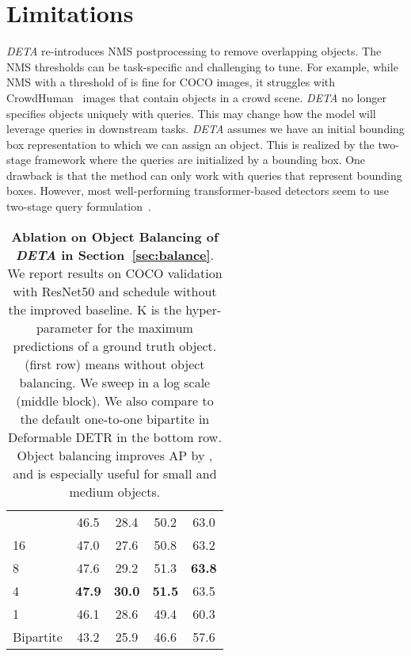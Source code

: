 \documentclass[10pt,twocolumn,letterpaper]{article}
\newcommand{\refsec}[1]{Section~\ref{sec:#1}}
\newcommand{\lbltbl}[1]{\label{tbl:#1}}
\def\name{{\textit{DETA}}\xspace}
\begin{document}
\section{Limitations}
\name re-introduces NMS postprocessing to remove overlapping objects.
The NMS thresholds can be task-specific and challenging to tune.
For example, while NMS with a threshold of  is fine for COCO images, it struggles with CrowdHuman~\cite{shao2018crowdhuman} images that contain objects in a crowd scene.
\name no longer specifies objects uniquely with queries.
This may change how the model will leverage queries in downstream tasks.
\name assumes we have an initial bounding box representation to which we can assign an object.
This is realized by the two-stage framework where the queries are initialized by a bounding box.
One drawback is that the method can only work with queries that represent bounding boxes.
However, most well-performing transformer-based detectors seem to use two-stage query formulation~\cite{zhang2022dino,zhu2020deformable}.

\begin{table}[!t]
\centering
\begin{tabular}{@{}l@{\ \ \ \ \ \ }c@{\ \ \ \ \ \ }c@{\ \ \ \ \ \ }c@{\ \ \ \ \ \ }c@{}}
\toprule
  &  &  &  & \\
\midrule
 & 46.5 & 28.4 & 50.2 & 63.0 \\
\midrule
 16 & 47.0 & 27.6 & 50.8 & 63.2 \\
  8 & 47.6 & 29.2 & 51.3 & \textbf{63.8} \\
  4 & \textbf{47.9} & \textbf{30.0} & \textbf{51.5} & 63.5 \\
  1 & 46.1 & 28.6 & 49.4 & 60.3 \\
\midrule
Bipartite  & 43.2 & 25.9 & 46.6 & 57.6 \\
\bottomrule
\end{tabular}
\caption{\textbf{Ablation on Object Balancing of \name in \refsec{balance}}.
We report results on COCO validation with ResNet50 and  schedule without the improved baseline.
K is the hyper-parameter for the maximum predictions of a ground truth object.
 (first row) means without object balancing.
We sweep  in a log scale (middle block).
We also compare to the default one-to-one bipartite in Deformable DETR in the bottom row.
Object balancing improves AP by , and is especially useful for small and medium objects.
}
\lbltbl{balance}
\vspace{-5mm}
\end{table}
\end{document}
